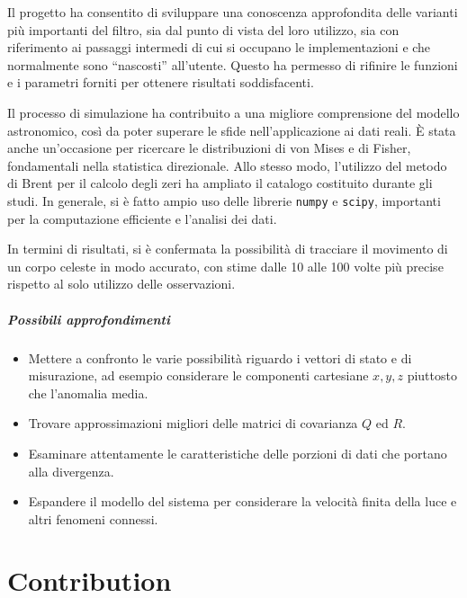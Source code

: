 \documentclass[12pt,a4paper,openright,twoside]{book}
\begin{document}

Il progetto ha consentito di sviluppare una conoscenza approfondita delle varianti più importanti del filtro, sia dal punto di vista del loro utilizzo, sia con riferimento ai passaggi intermedi di cui si occupano le implementazioni e che normalmente sono ``nascosti'' all'utente. Questo ha permesso di rifinire le funzioni e i parametri forniti per ottenere risultati soddisfacenti.

Il processo di simulazione ha contribuito a una migliore comprensione del modello astronomico, così da poter superare le sfide nell'applicazione ai dati reali. È stata anche un'occasione per ricercare le distribuzioni di von Mises e di Fisher, fondamentali nella statistica direzionale. Allo stesso modo, l'utilizzo del metodo di Brent per il calcolo degli zeri ha ampliato il catalogo costituito durante gli studi. In generale, si è fatto ampio uso delle librerie \lstinline{numpy} e \lstinline{scipy}, importanti per la computazione efficiente e l'analisi dei dati.

In termini di risultati, si è confermata la possibilità di tracciare il movimento di un corpo celeste in modo accurato, con stime dalle 10 alle 100 volte più precise rispetto al solo utilizzo delle osservazioni.

\paragraph{Possibili approfondimenti}

\begin{itemize}
\item Mettere a confronto le varie possibilità riguardo i vettori di stato e di misurazione, ad esempio considerare le componenti cartesiane $x,y,z$ piuttosto che l'anomalia media.
\item Trovare approssimazioni migliori delle matrici di covarianza $Q$ ed $R$.
\item Esaminare attentamente le caratteristiche delle porzioni di dati che portano alla divergenza.
\item Espandere il modello del sistema per considerare la velocità finita della luce e altri fenomeni connessi.
\end{itemize}

\iffalse %
\chapter{Contribution}
\end{document}
